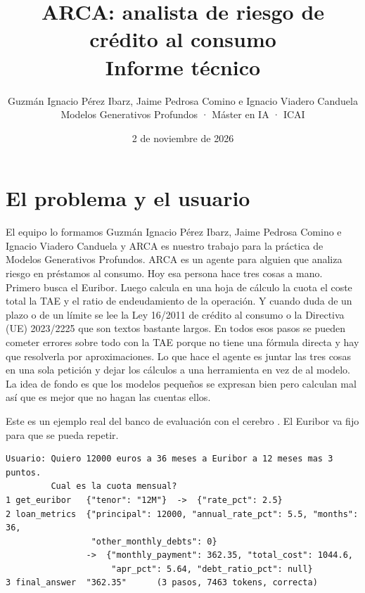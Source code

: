 \documentclass[10pt,a4paper]{article}
\title{ARCA: analista de riesgo de crédito al consumo\\[2pt]\large Informe técnico}
\author{Guzmán Ignacio Pérez Ibarz, Jaime Pedrosa Comino e Ignacio Viadero Canduela\\Modelos Generativos Profundos · Máster en IA · ICAI}
\date{2 de noviembre de 2026}
\newcommand{\code}[1]{\texttt{\detokenize{#1}}}
\begin{document}
\maketitle

\section{El problema y el usuario}
El equipo lo formamos Guzmán Ignacio Pérez Ibarz, Jaime Pedrosa Comino e Ignacio Viadero Canduela y ARCA es nuestro trabajo para la práctica de Modelos Generativos Profundos.
ARCA es un agente para alguien que analiza riesgo en préstamos al consumo. Hoy esa persona hace tres cosas a mano.
Primero busca el Euribor. Luego calcula en una hoja de cálculo la cuota el coste total la TAE y el ratio de endeudamiento de la operación.
Y cuando duda de un plazo o de un límite se lee la Ley 16/2011 de crédito al consumo o la Directiva (UE) 2023/2225 que son textos bastante largos.
En todos esos pasos se pueden cometer errores sobre todo con la TAE porque no tiene una fórmula directa y hay que resolverla por aproximaciones.
Lo que hace el agente es juntar las tres cosas en una sola petición y dejar los cálculos a una herramienta en vez de al modelo.
La idea de fondo es que los modelos pequeños se expresan bien pero calculan mal así que es mejor que no hagan las cuentas ellos.

Este es un ejemplo real del banco de evaluación con el cerebro \code{thinking}. El Euribor va fijo para que se pueda repetir.
\begin{center}\small
\begin{minipage}{0.95\linewidth}
\begin{verbatim}
Usuario: Quiero 12000 euros a 36 meses a Euribor a 12 meses mas 3 puntos.
         Cual es la cuota mensual?
1 get_euribor   {"tenor": "12M"}  ->  {"rate_pct": 2.5}
2 loan_metrics  {"principal": 12000, "annual_rate_pct": 5.5, "months": 36,
                 "other_monthly_debts": 0}
                ->  {"monthly_payment": 362.35, "total_cost": 1044.6,
                     "apr_pct": 5.64, "debt_ratio_pct": null}
3 final_answer  "362.35"      (3 pasos, 7463 tokens, correcta)
\end{verbatim}
\end{minipage}
\end{center}
\end{document}
